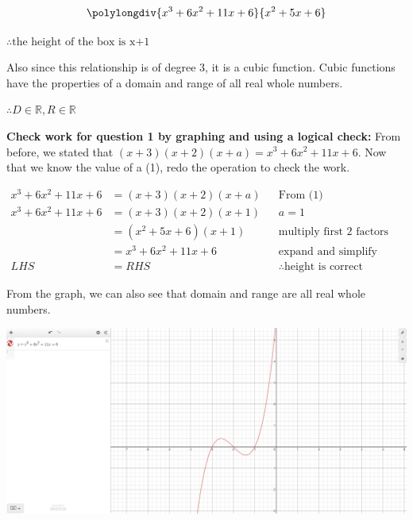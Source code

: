 \documentclass[12pt]{book}
\begin{document}
\begin{enumerate}
$$\polylongdiv{x^3+6x^2+11x+6}{x^2+5x+6}$$

\begin{center}
    $\boxed{\therefore \text{the height of the box is x+1}}$
    \vspace{1em}

    Also since this relationship is of degree 3, it is a cubic function. Cubic functions have the properties of a domain and range of all real whole numbers.
   
    $\boxed{\therefore D \in \mathbb{R}, R \in \mathbb{R}}$
\end{center}

\newpage

\textbf{Check work for question 1 by graphing and using a logical check:}
\vspace{1em}
From before, we stated that $(x+3)(x+2)(x+a) = x^3+6x^2+11x+6$. Now that we know the value of a (1), redo the operation to check the work.

\begin{align*}
    x^3+6x^2+11x+6 &= (x+3)(x+2)(x+a)&& \text{From (1)}\\
    x^3+6x^2+11x+6 &= (x+3)(x+2)(x+1) && a = 1\\
    &= (x^2+5x+6)(x+1) && \text{multiply first 2 factors and simplify} \\
    &= x^3+6x^2+11x+6 && \text{expand and simplify}\\
    LHS &= RHS && \therefore \text{height is correct}
\end{align*}

\vspace{1em}
From the graph, we can also see that domain and range are all real whole numbers.

\vspace{1.5em}
\includegraphics[width=\linewidth]{a2-1 graph.PNG}

\newpage


\end{enumerate}
\end{document}
